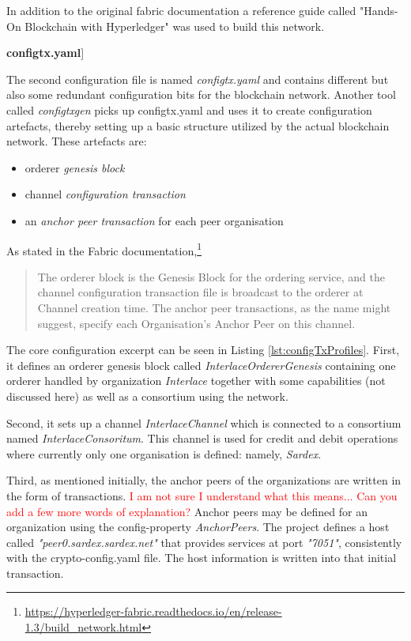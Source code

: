 In addition to the original fabric documentation a reference guide called "Hands-On Blockchain with Hyperledger" \cite{HandsOnBlockchainHyperledger2018} was used to build this network.

\textbf{configtx.yaml}]

The second configuration file is named \textit{configtx.yaml} and contains different but also some redundant configuration bits for the blockchain network. Another tool called \textit{configtxgen} picks up configtx.yaml and uses it to create configuration artefacts, thereby setting up a basic structure utilized by the actual blockchain network. These artefacts are:

\begin{itemize}
	\item orderer \textit{genesis block}
	\item channel \textit{configuration transaction}
	\item an \textit{anchor peer transaction} for each peer organisation
\end{itemize}

As stated in the Fabric documentation,\footnote{\url{https://hyperledger-fabric.readthedocs.io/en/release-1.3/build_network.html}}
\begin{quote}
\small
The orderer block is the Genesis Block for the ordering service, and the channel configuration transaction file is broadcast to the orderer at Channel creation time. The anchor peer transactions, as the name might suggest, specify each Organisation's Anchor Peer on this channel.
\end{quote}

The core configuration excerpt can be seen in Listing \ref{lst:configTxProfiles}. First, it defines an orderer genesis block called \textit{InterlaceOrdererGenesis} containing one orderer handled by organization \textit{Interlace} together with some capabilities (not discussed here) as well as a consortium using the network.

Second, it sets up a channel \textit{InterlaceChannel} which is connected to a consortium named \textit{InterlaceConsoritum}. This channel is used for credit and debit operations where currently only one organisation is defined: namely, \textit{Sardex}.

Third, as mentioned initially, the anchor peers of the organizations are written in the form of transactions. \textcolor{red}{I am not sure I understand what this means... Can you add a few more words of explanation?} Anchor peers may be defined for an organization using the config-property \textit{AnchorPeers}. The project defines a host called \textit{"peer0.sardex.sardex.net"} that provides services at port \textit{"7051"}, consistently with the crypto-config.yaml file. The host information is written into that initial transaction.

